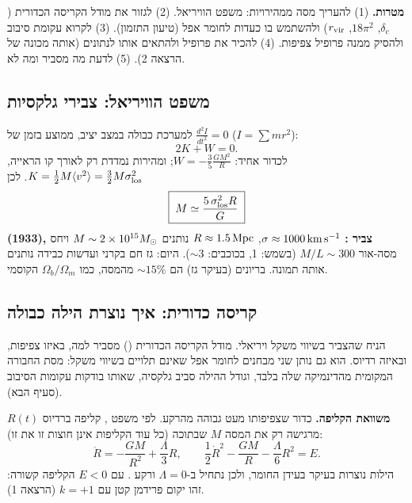 
\begin{goalbox}
\textbf{מטרות.} (1) להעריך מסה ממהירויות: משפט הוויריאל. (2) לגזור את מודל הקריסה הכדורית ($\delta_c$, $18\pi^2$, $r_{\rm vir}$) ולהשתמש בו כעדות לחומר אפל (טיעון התזמון). (3) לקרוא עקומת סיבוב ולהסיק ממנה פרופיל צפיפות. (4) להכיר את פרופיל  ולהתאים אותו לנתונים (אותה מכונה של הרצאה 2). (5) לדעת מה  מסביר ומה לא.
\end{goalbox}

\subsection{משפט הוויריאל: צבירי גלקסיות}
למערכת כבולה במצב יציב, ממוצע בזמן של $\frac{d^2I}{dt^2}=0$ ($I=\sum m r^2$):
\begin{equation}
2K+W=0 .
\end{equation}
לכדור אחיד: $W=-\frac35\frac{GM^2}{R}$; ומהירות נמדדת רק לאורך קו הראייה, $K=\frac12M\langle v^2\rangle=\frac32M\sigma_{\rm los}^2$. לכן
\begin{equation}
\boxed{\;M\simeq\frac{5\,\sigma_{\rm los}^2R}{G}\;}
\end{equation}
\textbf{ (1933), צביר :} $\sigma\approx1000\,\mathrm{km\,s^{-1}}$, $R\approx1.5\,\mathrm{Mpc}$ נותנים $M\sim2\times10^{15}M_{\odot}$ ויחס מסה-אור $M/L\sim300$ (בשמש: 1, בכוכבים: $\sim3$). היום: גז חם בקרני  ועדשות כבידה נותנים אותה תמונה. בריונים (בעיקר גז) הם $\sim15\%$ מהמסה, כמו $\Omega_b/\Omega_m$ הקוסמי.

\subsection{קריסה כדורית: איך נוצרת הילה כבולה}\label{sec:sc}
 הניח שהצביר בשיווי משקל ויריאלי. מודל הקריסה הכדורית () מסביר למה, באיזו צפיפות, ובאיזה רדיוס. הוא גם נותן שני מבחנים לחומר אפל שאינם תלויים בשיווי משקל: מסת החבורה המקומית מהדינמיקה שלה בלבד, וגודל ההילה סביב גלקסיה, שאותו בודקות עקומות הסיבוב (סעיף הבא).

\textbf{משוואת הקליפה.} כדור שצפיפותו מעט גבוהה מהרקע. לפי משפט , קליפה ברדיוס $R(t)$ מרגישה רק את המסה $M$ שבתוכה (כל עוד הקליפות אינן חוצות זו את זו):
\begin{equation}
\ddot R=-\frac{GM}{R^2}+\frac{\Lambda}{3}R,\qquad
\frac12\dot R^2-\frac{GM}{R}-\frac{\Lambda}{6}R^2=E .
\label{eq:sc-eom}
\end{equation}
הילות נוצרות בעיקר בעידן החומר, ולכן נתחיל ב-$\Lambda=0$ ורקע . עם $E<0$ הקליפה קשורה: זהו יקום פרידמן קטן עם $k=+1$ (הרצאה 1).

